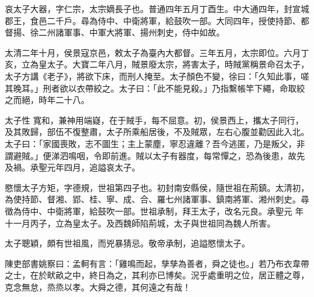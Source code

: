 \begin{pinyinscope}
 哀太子大器，字仁宗，太宗嫡長子也。普通四年五月丁酉生。中大通四年，封宣城郡王，食邑二千戶。尋為侍中、中衛將軍，給鼓吹一部。大同四年，授使持節、都督揚、徐二州諸軍事、中軍大將軍、揚州刺史，侍中如故。



 太清二年十月，侯景寇京邑，敕太子為臺內大都督。三年五月，太宗即位。六月丁亥，立為皇太子。大寶二年八月，賊景廢太宗，將害太子，時賊黨稱景命召太子，太子方講《老子》，將欲下床，而刑人掩至。太子顏色不變，徐曰：「久知此事，嗟其晚耳。」刑者欲以衣帶絞之。太子曰：「此不能見殺。」乃指繫帳竿下繩，命取絞之而絕，時年二十八。



 太子性
 寬和，兼神用端嶷，在于賊手，每不屈意。初，侯景西上，攜太子同行，及其敗歸，部伍不復整肅，太子所乘船居後，不及賊眾，左右心腹並勸因此入北。太子曰：「家國喪敗，志不圖生；主上蒙塵，寧忍違離？吾今逃匿，乃是叛父，非謂避賊。」便涕泗鳴咽，令即前進。賊以太子有器度，每常憚之，恐為後患，故先及禍。承聖元年四月，追謚哀太子。



 愍懷太子方矩，字德規，世祖第四子也。初封南安縣侯，隨世祖在荊鎮。太清初，為使持節、督湘、郢、桂、寧、成、合、羅七州諸軍事、鎮南將軍、湘州刺史。尋徵為侍中、中衛將軍，給鼓吹一部。世祖承制，拜王太子，改名元良。承聖元
 年十一月丙子，立為皇太子。及西魏師陷荊城，太子與世祖同為魏人所害。



 太子聰穎，頗有世祖風，而兇暴猜忌。敬帝承制，追謚愍懷太子。



 陳吏部書姚察曰：孟軻有言：「雞鳴而起，孳孳為善者，舜之徒也。」若乃布衣韋帶之士，在於畎畝之中，終日為之，其利亦已博矣。況乎處重明之位，居正體之尊，克念無怠，烝烝以孝。大舜之德，其何遠之有哉！



\end{pinyinscope}